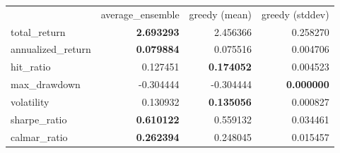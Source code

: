 \begin{tabular}{lrrr}
 & average_ensemble & greedy (mean) & greedy (stddev) \\
total_return & \bfseries 2.693293 & 2.456366 & 0.258270 \\
annualized_return & \bfseries 0.079884 & 0.075516 & 0.004706 \\
hit_ratio & 0.127451 & \bfseries 0.174052 & 0.004523 \\
max_drawdown & -0.304444 & -0.304444 & \bfseries 0.000000 \\
volatility & 0.130932 & \bfseries 0.135056 & 0.000827 \\
sharpe_ratio & \bfseries 0.610122 & 0.559132 & 0.034461 \\
calmar_ratio & \bfseries 0.262394 & 0.248045 & 0.015457 \\
\end{tabular}
